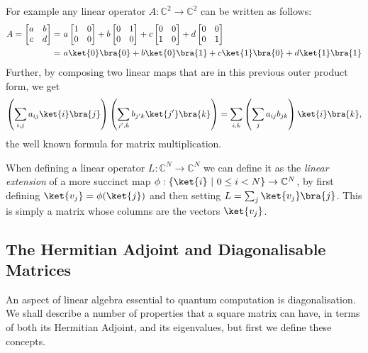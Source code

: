 For example any linear operator $A: \mathbb{C}^2 \to \mathbb{C}^2$ can be written as follows:
\begin{align*}
	A = \left[\begin{matrix}
		a&b\\
		c&d
	\end{matrix}\right]
	=&\ 
	a\left[\begin{matrix}
		1&0\\
		0&0
	\end{matrix}\right]
	+
	b\left[\begin{matrix}
		0&1\\
		0&0
	\end{matrix}\right]
	+
	c\left[\begin{matrix}
		0&0\\
		1&0
	\end{matrix}\right]
	+
	d\left[\begin{matrix}
		0&0\\
		0&1
	\end{matrix}\right]
	\\=&\  a\ket{0}\bra{0}+b\ket{0}\bra{1}+c\ket{1}\bra{0}+d\ket{1}\bra{1}
\end{align*}
Further, by composing two linear maps that are in this previous outer product form, we get
\[\left(\sum_{i,j}a_{ij}\ket{i}\bra{j}\right)\left(\sum_{j',k}b_{j'k}\ket{j'}\bra{k}\right) = \sum_{i,k}\left(\sum_j a_{ij}b_{jk}\right)\ket{i}\bra{k},\]
the well known formula for matrix multiplication.

When defining a linear operator $L: \mathbb{C}^N \to \mathbb{C}^N$ we can define it as the \emph{linear extension} of a more succinct map $\phi: \{\ket{i}\ |\ 0 \leq i < N\} \to \mathbb{C}^N$, by first defining $\ket{v_j} = \phi(\ket{j})$ and then setting $L = \sum_{j} \ket{v_j}\bra{j}$. This is simply a matrix whose columns are the vectors $\ket{v_j}$.
\subsection{The Hermitian Adjoint and Diagonalisable Matrices}\label{diagonalisable}
An aspect of linear algebra essential to quantum computation is diagonalisation. We shall describe a number of properties that a square matrix can have, in terms of both its Hermitian Adjoint, and its eigenvalues, but first we define these concepts.

